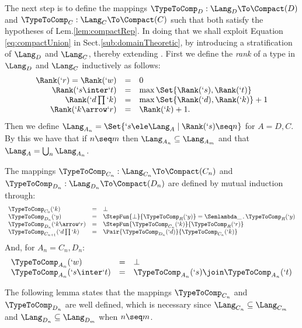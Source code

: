 \documentclass{lmcs}
\begin{document}
The next step is to define the mappings $\TypeToComp_D:\Lang_D \To \Compact(D)$ and $\TypeToComp_C:\Lang_C \To \Compact(C)$ such that both satisfy the hypotheses of Lem.\skp\ref{lem:compactRep}. 
In doing that we shall exploit Equation \ref{eq:compactUnion} in Sect.\skp\ref{sub:domainTheoretic}, by introducing a stratification of $\Lang_D$ and $\Lang_C$, thereby extending \cite{Dezani-Honsell-Alessi'03}. 
First we define the \emph{rank} of a type in $\Lang_D$ and $\Lang_C$ inductively as follows:
%
 \[ \begin{array}{rcl}
 \Rank(`r) = \Rank(`w) &=& 0 \\
 \Rank(`s \inter `t) &=& \max \Set{\Rank(`s), \Rank(`t)} \\
 \Rank(`d\prod `k) &=& \max \Set{\Rank(`d), \Rank(`k)} + 1 \\
 \Rank(`k\arrow `r) &=&\Rank(`k) + 1.
 \end{array} \]
Then we define $\Lang_{A_n} = \Set{`s \ele \Lang_A \mid \Rank(`s) \seq n}$ for $A=D,C$. By this we have that if $n \seq m$ then $\Lang_{A_n} \subseteq \Lang_{A_m}$ and that $\Lang_A = \bigcup_n \Lang_{A_n}$.


 \begin{defi} \label{def:typesToComp}
The mappings $ \TypeToComp_{C_n}: \Lang_{C_n} \To \Compact(C_n)$ and
$ \TypeToComp_{D_n}: \Lang_{D_n} \To \Compact(D_n)$ are defined by mutual induction through:
%
 \[ \begin{array}{lcl}
 \TypeToComp_{C_0}(`k) &=& \bot \\
 \TypeToComp_{D_n}(`y) &=& \StepFun{\bot }{ \TypeToComp_R(`y)} = \Semlambda \_ \, . \, \TypeToComp_R(`y) \\
 \TypeToComp_{D_n}(`k\arrow `r) &=& \StepFun{\TypeToComp_{C_n}(`k) }{ \TypeToComp_R(`r)} \\
 \TypeToComp_{C_{n+1}}(`d\prod `k) &=& \Pair{\TypeToComp_{D_n}(`d) }{ \TypeToComp_{C_n}(`k)}
 \end{array} \]
And, for $A_n = C_n, D_n$:
%
 \[ \begin{array}{lll}
 \TypeToComp_{A_n}(`w) &=& \bot \\
 \TypeToComp_{A_n}(`s \inter`t) &=& \TypeToComp_{A_n}(`s) \join \TypeToComp_{A_n}(`t)
 \end{array} \]
 \end{defi}

The following lemma states that the mappings $\TypeToComp_{C_n}$ and $\TypeToComp_{D_n}$ are well defined, which is necessary since $\Lang_{C_n} \subseteq \Lang_{C_m}$ and $\Lang_{D_n} \subseteq \Lang_{D_m}$ when $n\seq m$.
\end{document}
